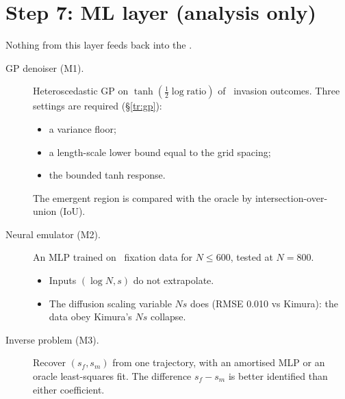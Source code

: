 \section{Step 7: ML layer (analysis only)}
Nothing from this layer feeds back into the \IBM.
\begin{description}
\item[GP denoiser (M1).] Heteroscedastic GP on $\tanh(\tfrac12\log\text{ratio})$ of \IBM\ invasion outcomes. Three settings are required (\S\ref{tr:gp}):
  \begin{itemize}
  \item a variance floor;
  \item a length-scale lower bound equal to the grid spacing;
  \item the bounded tanh response.
  \end{itemize}
  The emergent region is compared with the oracle by intersection-over-union (IoU).
\item[Neural emulator (M2).] An MLP trained on \IBM\ fixation data for $N\le600$, tested at $N=800$.
  \begin{itemize}
  \item Inputs $(\log N,s)$ do not extrapolate.
  \item The diffusion scaling variable $Ns$ does (RMSE 0.010 vs Kimura): the data obey Kimura's $Ns$ collapse.
  \end{itemize}
\item[Inverse problem (M3).] Recover $(s_f,s_m)$ from one trajectory, with an amortised MLP or an oracle least-squares fit. The difference $s_f-s_m$ is better identified than either coefficient.
\end{description}
